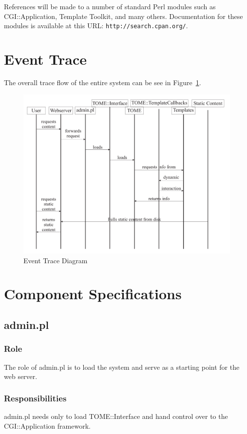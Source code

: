 \documentclass[12pt,titlepage]{article}
\begin{document}
References will be made to a number of standard Perl modules such as CGI::Application, Template Toolkit, and many others.  Documentation for these modules is available at this URL: \texttt{http://search.cpan.org/}.
\section{Event Trace}
The overall trace flow of the entire system can be see in Figure~\ref{EventDiagram}.
\begin{figure}[h]
	\includegraphics[width=\textwidth]{EventDiagram}
	\caption{Event Trace Diagram}
	\label{EventDiagram}
\end{figure}

\section{Component Specifications}

\subsection{admin.pl}
\subsubsection{Role}
The role of admin.pl is to load the system and serve as a starting point for the web server.
\subsubsection{Responsibilities}
admin.pl needs only to load TOME::Interface and hand control over to the CGI::Application framework.
\end{document}

